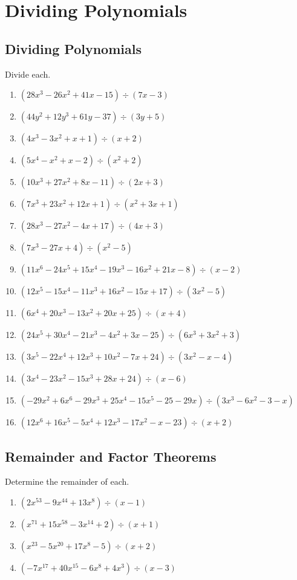 \chapter{Dividing Polynomials}

\section{Dividing Polynomials}

Divide each.
\begin{enumerate}
    \item $(28x^3-26x^2+41x-15) \div (7x-3)$
    \item $(44y^2+12y^3+61y-37) \div (3y+5)$
    \item $\left(4x^3 - 3x^2 + x + 1\right) \div (x + 2)$
    \item $\left(5x^4 - x^2 + x - 2\right) \div (x^2 + 2)$
    \item $\left(10x^3 + 27x^2 + 8x - 11\right) \div (2x+3)$
	\item $\left(7x^3 + 23x^2 + 12x + 1\right) \div \left(x^2+3x+1\right)$
	\item $\left(28x^3-27x^2-4x+17\right) \div (4x+3)$
	\item $\left(7x^3-27x+4\right) \div \left(x^2-5\right)$
	\item $\left(11x^6-24x^5+15x^4-19x^3-16x^2+21x-8\right) \div (x-2)$
	\item $\left(12x^5-15x^4-11x^3+16x^2-15x+17\right) \div \left(3x^2-5\right)$
	\item $\left(6x^4+20x^3-13x^2+20x+25\right) \div (x+4)$
	\item $\left(24x^5+30x^4-21x^3-4x^2+3x-25\right) \div \left(6x^3+3x^2+3\right)$
	\item $\left(3x^5-22x^4+12x^3+10x^2-7x+24\right) \div \left(3x^2-x-4\right)$
	\item $\left(3x^4-23x^2-15x^3+28x+24\right) \div (x-6)$
	\item $\left(-29x^2+6x^6-29x^3+25x^4-15x^5-25-29x\right) \div \left(3x^3-6x^2-3-x\right)$
	\item $\left(12x^6+16x^5-5x^4+12x^3-17x^2-x-23\right) \div (x+2)$
\end{enumerate}

\section{Remainder and Factor Theorems}

Determine the remainder of each.
\begin{enumerate}
	\item $\left(2x^{53} - 9x^{44} + 13x^8\right) \div (x - 1)$
	\item $\left(x^{71} + 15x^{58} - 3x^{14} + 2\right) \div (x + 1)$
	\item $\left(x^{23}-5x^{20}+17x^8-5\right) \div (x+2)$
	\item $\left(-7x^{17} + 40x^{15} - 6x^8 + 4x^3\right) \div (x-3)$
\end{enumerate}

